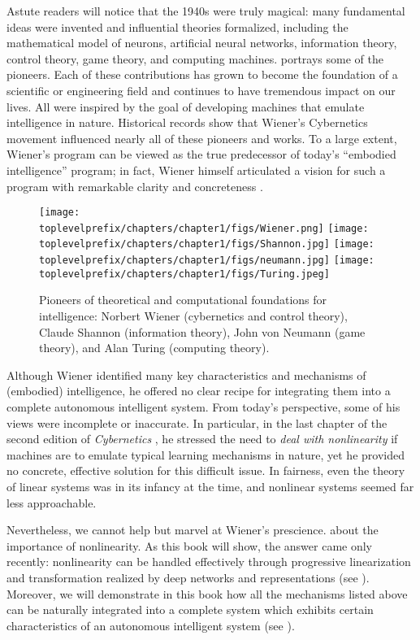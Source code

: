 \documentclass[../../book-main.tex]{subfiles}
\begin{document}
Astute readers will notice that the 1940s were truly magical: many fundamental ideas were invented and influential theories formalized, including the mathematical model of neurons, artificial neural networks, information theory, control theory, game theory, and computing machines.  portrays some of the pioneers. Each of these contributions has grown to become the foundation of a scientific or engineering field and continues to have tremendous impact on our lives. All were inspired by the goal of developing machines that emulate intelligence in nature. Historical records show that Wiener's Cybernetics movement influenced nearly all of these pioneers and works. To a large extent, Wiener's program can be viewed as the true predecessor of today's ``embodied intelligence'' program; in fact, Wiener himself articulated a vision for such a program with remarkable clarity and concreteness \cite{Wiener-Cybernetics-1961}.
\begin{figure}
    \centering
    \texttt{[image: \\toplevelprefix/chapters/chapter1/figs/Wiener.png]}
    \texttt{[image: \\toplevelprefix/chapters/chapter1/figs/Shannon.jpg]}
    \texttt{[image: \\toplevelprefix/chapters/chapter1/figs/neumann.jpg]}
    \texttt{[image: \\toplevelprefix/chapters/chapter1/figs/Turing.jpeg]}
    \caption{Pioneers of theoretical and computational foundations for intelligence: Norbert Wiener (cybernetics and control theory), Claude Shannon (information theory), John von Neumann (game theory), and Alan Turing (computing theory).}
    \label{fig:god-fathers}
\end{figure}

Although Wiener identified many key characteristics and mechanisms of (embodied) intelligence, he offered no clear recipe for integrating them into a complete autonomous intelligent system. From today's perspective, some of his views were incomplete or inaccurate. In particular, in the last chapter of the second edition of \textit{Cybernetics} \cite{Wiener-Cybernetics-1961}, he stressed the need to \textit{deal with nonlinearity} if machines are to emulate typical learning mechanisms in nature, yet he provided no concrete, effective solution for this difficult issue. In fairness, even the theory of linear systems was in its infancy at the time, and nonlinear systems seemed far less approachable.

Nevertheless, we cannot help but marvel at Wiener's prescience. about the importance of nonlinearity. As this book will show, the answer came only recently: nonlinearity can be handled effectively through progressive linearization and transformation realized by deep networks and representations (see ). Moreover, we will demonstrate in this book how all the mechanisms listed above can be naturally integrated into a complete system which exhibits certain characteristics of an autonomous intelligent system (see ).
\end{document}

